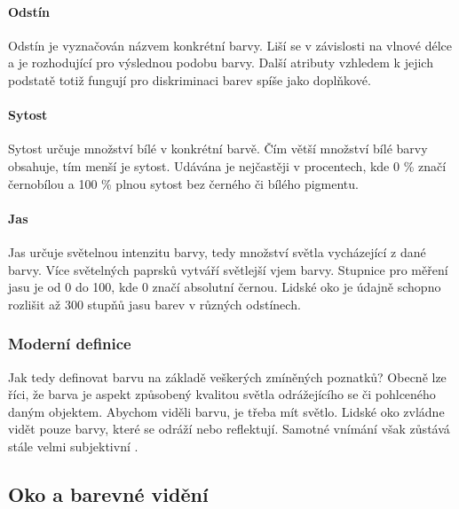 \paragraph{Odstín}
Odstín je vyznačován názvem konkrétní barvy. Liší se v závislosti na vlnové délce a je rozhodující pro výslednou podobu barvy. Další atributy vzhledem k jejich
podstatě totiž fungují pro diskriminaci barev spíše jako doplňkové.

\paragraph{Sytost}
Sytost určuje množství bílé v konkrétní barvě. Čím větší množství bílé barvy obsahuje, tím menší je sytost. Udávána je nejčastěji v procentech, kde 0 \% značí černobílou a 100 \% 
plnou sytost bez černého či bílého pigmentu.

\paragraph{Jas}
Jas určuje světelnou intenzitu barvy, tedy množství světla vycházející z dané barvy. Více světelných paprsků vytváří světlejší vjem barvy. Stupnice pro měření jasu je od 0 do 100, kde 0
značí absolutní černou. Lidské oko je údajně schopno rozlišit až 300 stupňů jasu barev v různých odstínech.


\subsubsection{Moderní definice}
Jak tedy definovat barvu na základě veškerých zmíněných poznatků? Obecně lze říci, že barva je aspekt způsobený kvalitou světla odrážejícího se či pohlceného daným objektem.
Abychom viděli barvu, je třeba mít světlo. Lidské oko zvládne vidět pouze barvy, které se odráží nebo reflektují. Samotné vnímání však zůstává stále velmi subjektivní \cite{pantone}.


\subsection{Oko a barevné vidění}

